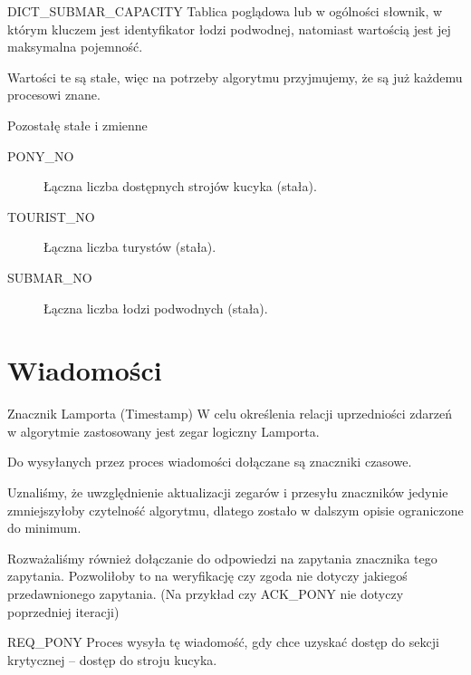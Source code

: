 \documentclass{beamer}
\begin{document}
\begin{frame}{DICT\_SUBMAR\_CAPACITY}
    \internallinenumbers
    \resetlinenumber[1]
    Tablica poglądowa lub w ogólności słownik, w którym kluczem jest identyfikator łodzi podwodnej, natomiast wartością jest jej maksymalna pojemność.

    \vspace{0.4cm}
    Wartości te są stałe, więc na potrzeby algorytmu przyjmujemy, że są już każdemu procesowi znane.
\end{frame}


\begin{frame}{Pozostałę stałe i zmienne}
    \begin{description}
        \item [PONY\_NO] Łączna liczba dostępnych strojów kucyka (stała).
        \item [TOURIST\_NO] Łączna liczba turystów (stała).
        \item [SUBMAR\_NO] Łączna liczba łodzi podwodnych (stała).
    \end{description}

\end{frame}

\section{Wiadomości}
\begin{frame}{Znacznik Lamporta (Timestamp)}
    \internallinenumbers
    \resetlinenumber[1]
    W celu określenia relacji uprzedniości zdarzeń w algorytmie zastosowany jest zegar logiczny Lamporta.

    \vspace{0.7cm}
    Do wysyłanych przez proces wiadomości dołączane są znaczniki czasowe.
    
    \vspace{0.7cm}
    Uznaliśmy, że uwzględnienie aktualizacji zegarów i przesyłu znaczników jedynie zmniejszyłoby czytelność algorytmu, dlatego zostało w dalszym opisie ograniczone do minimum.

    \vspace{0.7cm}
    Rozważaliśmy również dołączanie do odpowiedzi na zapytania znacznika tego zapytania. Pozwoliłoby to na weryfikację czy zgoda nie dotyczy jakiegoś przedawnionego zapytania. (Na przykład czy ACK\_PONY nie dotyczy poprzedniej iteracji)
\end{frame}

\begin{frame}{REQ\_PONY}
    \internallinenumbers
    \resetlinenumber[1]
    Proces wysyła tę wiadomość, gdy chce uzyskać dostęp do sekcji krytycznej – dostęp do stroju kucyka.
\end{frame}
\end{document}
